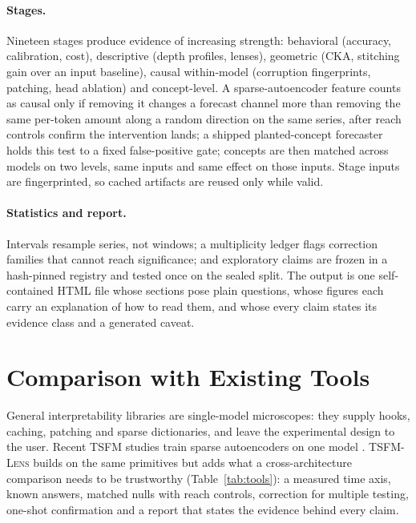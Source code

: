 \documentclass[twoside,11pt]{article}
\newcommand{\tool}{\textsc{TSFM-Lens}}
\begin{document}
\paragraph{Stages.} Nineteen stages produce evidence of increasing strength: behavioral (accuracy, calibration, cost),
descriptive (depth profiles, lenses), geometric (CKA, stitching gain over an input baseline), causal within-model
(corruption fingerprints, patching, head ablation) and concept-level. A sparse-autoencoder feature counts as causal
only if removing it changes a forecast channel more than removing the same per-token amount along a random direction on
the same series, after reach controls confirm the intervention lands; a shipped planted-concept forecaster holds this test to a
fixed false-positive gate; concepts are then matched across models on two levels, same inputs and
same effect on those inputs. Stage inputs are fingerprinted, so cached artifacts are reused only while valid.

\paragraph{Statistics and report.} Intervals resample series, not windows; a multiplicity ledger flags correction
families that cannot reach significance; and exploratory claims are frozen in a hash-pinned registry and tested once
on the sealed split. The output is one self-contained HTML file whose sections pose plain questions, whose figures each
carry an explanation of how to read them, and whose every claim states its evidence class and a generated caveat.

\section{Comparison with Existing Tools}

General interpretability libraries are single-model microscopes: they supply hooks, caching, patching and sparse
dictionaries, and leave the experimental design to the user. Recent TSFM studies train sparse autoencoders on one
model \citep{mishra2026dissecting,oublal2026timesae,divo2026zeitgeist}. \tool{} builds on the same primitives but
adds what a cross-architecture comparison needs to be trustworthy (Table~\ref{tab:tools}): a measured time axis,
known answers, matched nulls with reach controls, correction for multiple testing, one-shot confirmation and a
report that states the evidence behind every claim.
\end{document}
